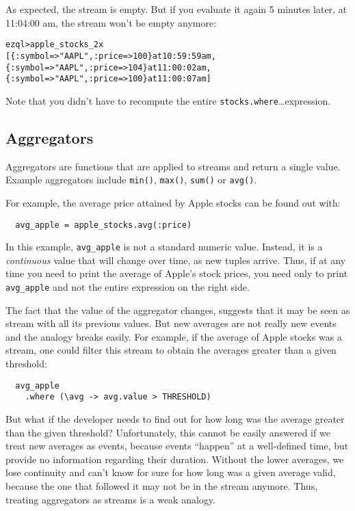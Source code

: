 \documentclass{report}
\newenvironment{evaluation}
{
  \framed
  \begin{alltt}
}
{
  \end{alltt}
  \endframed
}
\begin{document}
As expected, the stream is empty. But if you evaluate it again 5
minutes later, at 11:04:00 am, the stream won't be empty anymore:

\begin{evaluation}
  ezql> apple_stocks_2x
  [\{ :symbol => "AAPL", :price => 100 \} at 10:59:59 am,
   \{ :symbol => "AAPL", :price => 104 \} at 11:00:02 am,
   \{ :symbol => "AAPL", :price => 100 \} at 11:00:07 am]
\end{evaluation}

Note that you didn't have to recompute the entire
\verb=stocks.where=\ldots expression.

\subsection{Aggregators}
\label{sec:aggregators}

Aggregators are functions that are applied to streams and return a
single value. Example aggregators include \verb=min()=, \verb=max()=,
\verb=sum()= or \verb=avg()=.

For example, the average price attained by Apple stocks can be
found out with:

\begin{verbatim}
  avg_apple = apple_stocks.avg(:price)
\end{verbatim}

In this example, \verb=avg_apple= is not a standard numeric
value. Instead, it is a \emph{continuous} value that will change over
time, as new tuples arrive. Thus, if at any time you need to print the
average of Apple's stock prices, you need only to print
\verb=avg_apple= and not the entire expression on the right side.

The fact that the value of the aggregator changes, suggests that it
may be seen as stream with all its previous values. But new averages
are not really new events and the analogy breaks easily. For example,
if the average of Apple stocks was a stream, one could filter this
stream to obtain the averages greater than a given threshold:

\begin{verbatim}
  avg_apple
    .where (\avg -> avg.value > THRESHOLD)
\end{verbatim}

But what if the developer needs to find out for how long was the
average greater than the given threshold? Unfortunately, this cannot
be easily answered if we treat new averages as events, because events
``happen'' at a well-defined time, but provide no information
regarding their duration. Without the lower averages, we lose
continuity and can't know for sure for how long was a given average
valid, because the one that followed it may not be in the stream
anymore. Thus, treating aggregators as streams is a weak analogy.
\end{document}

